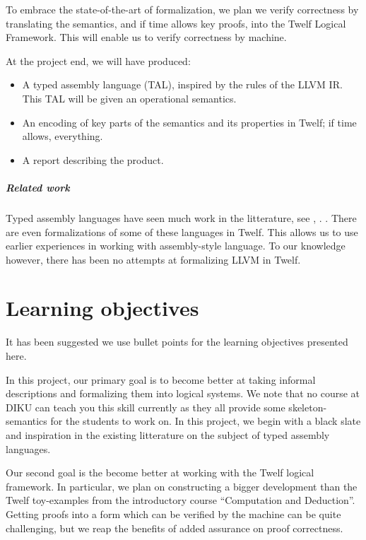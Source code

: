 \documentclass[a4paper, oneside, 10pt, draft]{memoir}
\begin{document}
To embrace the state-of-the-art of formalization, we plan we verify
correctness by translating the semantics, and if time allows key
proofs, into the Twelf Logical Framework. This will enable us to
verify correctness by machine.

At the project end, we will have produced:
\begin{itemize}
\item A typed assembly language (TAL), inspired by the rules of the LLVM
  IR. This TAL will be given an operational semantics.
\item An encoding of key parts of the semantics and its properties in
  Twelf; if time allows, everything.
\item A report describing the product.
\end{itemize}

\paragraph{Related work}

Typed assembly languages have seen much work in the litterature, see
\cite{crary:..}, \cite{morisett:...}. . There are even formalizations of some of these languages in
Twelf. This allows us to use earlier experiences in working with
assembly-style language. To our knowledge
however, there has been no attempts at formalizing LLVM in Twelf.

\chapter*{Learning objectives}

\begin{afixme}
  It has been suggested we use bullet points for the learning
  objectives presented here.
\end{afixme}
In this project, our primary goal is to become better at taking
informal descriptions and formalizing them into logical
systems.  We
note that no course at DIKU can teach you this skill currently as they
all provide some skeleton-semantics for the students to work on. In
this project, we begin with a black slate and inspiration in the
existing litterature on the subject of typed assembly languages.

Our second goal is the become better at working with the Twelf logical
framework. In particular, we plan on constructing a bigger development
than the Twelf toy-examples from the introductory course ``Computation
and Deduction''. Getting proofs into a form which can be verified by
the machine can be quite challenging, but we reap the benefits of
added assurance on proof correctness.


\end{document}
